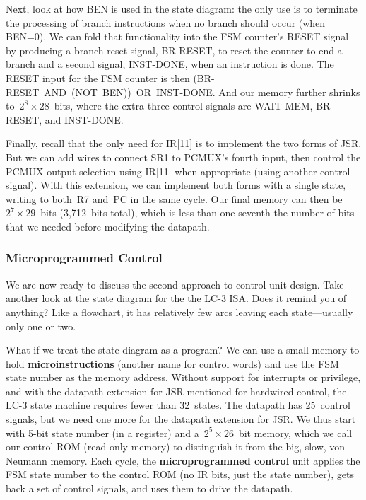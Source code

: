 Next, look at how BEN is used in the state diagram:
the only use is to terminate the
processing of branch instructions when no branch should occur (when 
BEN=0).  We can fold that functionality into the FSM counter's RESET
signal by producing a branch reset signal, \mbox{BR-RESET}, to reset
the counter to end a branch and a second signal, \mbox{INST-DONE},
when an instruction is done.  The RESET input for the FSM counter
is then (\mbox{BR-RESET}~AND~(NOT~BEN))~OR~\mbox{INST-DONE}.
%
And our memory further shrinks to~$2^8\times{28}$~bits, where the extra
three control signals are \mbox{WAIT-MEM}, \mbox{BR-RESET}, and 
\mbox{INST-DONE}.

Finally, recall that the only need for IR[11] is to implement the two
forms of JSR.  But we can add wires to connect SR1 to PCMUX's fourth 
input, then control the PCMUX output selection using IR[11] when appropriate
(using another control signal).  With this extension, we can implement
both forms with a single state, writing to both~R7 and~PC in the same
cycle.
%
Our final memory can then be~$2^7\times{29}$~bits (3,712~bits total),
which is less than one-seventh the number of bits that we needed before 
modifying the datapath.\\


\pagebreak

\subsubsection{Microprogrammed Control}

We are now ready to discuss the second approach to control unit design.
Take another look at the state diagram for the the \mbox{LC-3} ISA.  Does it 
remind you of anything?  Like a flowchart, it has relatively few arcs 
leaving each state---usually only one or two.

What if we treat the state diagram as a program?  We can use a small
memory to hold {\bf microinstructions} (another name for control words) 
and use the FSM state number as the memory address.  
%
Without support for interrupts or privilege, and with the datapath 
extension for JSR mentioned for hardwired control, the \mbox{LC-3} state 
machine requires fewer than 32~states.
%
The datapath has 25~control signals, but we need one more for the
datapath extension for JSR.
%
We thus start with \mbox{5-bit} state number (in a register)
and a~\mbox{$2^5\times{26}$~bit} memory, which we call
our control ROM (read-only memory) to distinguish
it from the big, slow, von Neumann memory.
%
Each cycle, the {\bf microprogrammed control} unit applies the FSM state 
number to the control ROM (no IR bits, 
just the state number), gets back a set of control signals, and
uses them to drive the datapath.

